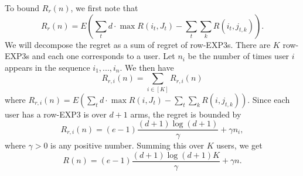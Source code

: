 To bound $R_r(n)$, we first note that
$$R_r(n) =  E \left( \sum_{t} d\cdot \max R(i_t,J_t)  - \sum_{t} \sum_k R(i_t,j_{t,k}) \right) .$$ 
We will decompose the regret as a sum of regret of row-EXP3s. There are $K$ row-EXP3s and each one corresponds to a user. Let $n_i$ be the number of times user $i$ appears in the sequence $i_1,...,i_n$. We then have 
$$R_{r,i}(n) = \sum_{i \in [K]} R_{r,i}(n) $$ 
where $R_{r,i}(n) = E \left( \sum_{t} d \cdot \max R(i,J_t)  - \sum_{t} \sum_k R(i,j_{t,k}) \right) .$ Since each user has a row-EXP3 is over $d+1$ arms, the regret is bounded by
$$R_{r,i}(n) =  (e-1)\frac{(d+1)\log (d+1)}{\gamma} + \gamma n_i,$$
where $\gamma >0$ is any positive number. Summing this over $K$ users, we get
$$R(n) =  (e-1)\frac{(d+1)\log (d+1)K}{\gamma} + \gamma n.$$

%

